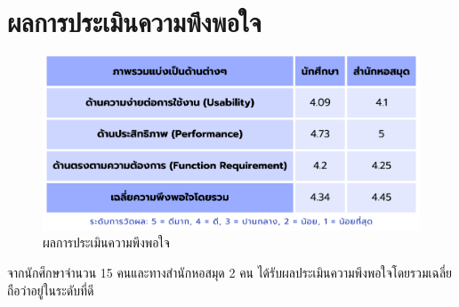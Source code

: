 \section{ผลการประเมินความพึงพอใจ}
\begin{figure}[ht]
    \centering
    \includegraphics[scale=0.4]{images/satisfaction.png}
    \caption[satisfaction]{ผลการประเมินความพึงพอใจ}
    \label{fig:satisfaction}
\end{figure}
จากนักศึกษาจำนวน 15 คนและทางสำนักหอสมุด 2 คน ได้รับผลประเมินความพึงพอใจโดยรวมเฉลี่ยถือว่าอยู่ในระดับที่ดี


